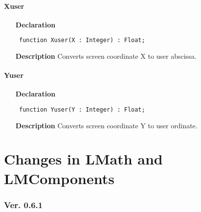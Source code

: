 \documentclass[12pt,a4paper,oneside]{report}
\newcommand{\declarationitem}[1]{\textbf{#1}}
\newcommand{\descriptiontitle}[1]{\textbf{#1}}
\newcommand{\code}[1]{\texttt{#1}}
\begin{document}
\subsubsection{Xuser}
\label{uwinplot-Xuser}
\begin{itemize}\item[\declarationitem{Declaration}\hfill]
	\begin{flushleft}
		\code{
			function Xuser(X : Integer) : Float;}
		
	\end{flushleft}
	
	\par
	\item[\descriptiontitle{Description}]
	Converts screen coordinate X to user abscissa.
	
\end{itemize}
\subsubsection{Yuser}
\label{uwinplot-Yuser}
\begin{itemize}\item[\declarationitem{Declaration}\hfill]
	\begin{flushleft}
		\code{
			function Yuser(Y : Integer) : Float;}
		
	\end{flushleft}
	
	\par
	\item[\descriptiontitle{Description}]
	Converts screen coordinate Y to user ordinate.
\end{itemize}
\chapter{Changes in LMath and LMComponents}
\subsection*{Ver. 0.6.1}
\end{document}
